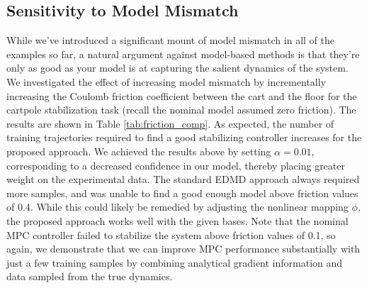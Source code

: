 \documentclass[../root.tex]{subfiles}
\begin{document}

\subsection{Sensitivity to Model Mismatch}

While we've introduced a significant mount of model mismatch in all of the examples so far,
a natural argument against model-based methods is that they're only as good as your model is
at capturing the salient dynamics of the system.  We investigated the effect of increasing
model mismatch by incrementally increasing the Coulomb friction coefficient between the cart
and the floor for the cartpole stabilization task (recall the nominal model assumed zero
friction). The results are shown in Table \ref{tab:friction_comp}. As expected, the number
of training trajectories required to find a good stabilizing controller increases for the
proposed approach. We achieved the results above by setting $\alpha = 0.01$, corresponding 
to a decreased confidence in our model, thereby placing greater weight on the experimental 
data. The standard EDMD approach always required more samples, and was unable to find a good
enough model above friction values of 0.4. While this could likely be remedied by adjusting
the nonlinear mapping $\phi$, the proposed approach works well with the given bases.  Note
that the nominal MPC controller failed to stabilize the system above friction values of 0.1,
so again, we demonstrate that we can improve MPC performance substantially with just a few
training samples by combining analytical gradient information and data sampled from the true
dynamics.
\end{document}
